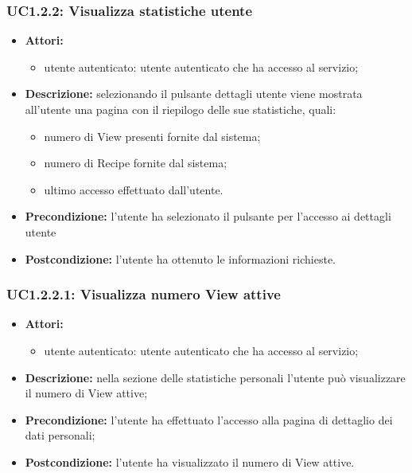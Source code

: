 \subsubsection{UC1.2.2: Visualizza statistiche utente}

\begin{itemize}
	\item \textbf{Attori:}
	\begin{itemize}
		\item utente autenticato: utente autenticato che ha accesso al servizio;
	\end{itemize}
	\item \textbf{Descrizione:} selezionando il pulsante dettagli utente viene mostrata all'utente una pagina con il riepilogo delle sue statistiche, quali:
	\begin{itemize}
		\item numero di View presenti fornite dal sistema;
		\item numero di Recipe fornite dal sistema;
		\item ultimo accesso effettuato dall'utente.
	\end{itemize}
  \item \textbf{Precondizione:} l'utente ha selezionato il pulsante per l'accesso ai dettagli utente
	\item \textbf{Postcondizione:} l'utente ha ottenuto le informazioni richieste.
\end{itemize}

\subsubsection{UC1.2.2.1: Visualizza numero View attive}

\begin{itemize}
	\item \textbf{Attori:}
	\begin{itemize}
		\item utente autenticato: utente autenticato che ha accesso al servizio;
	\end{itemize}
	\item \textbf{Descrizione:} nella sezione delle statistiche personali l'utente può visualizzare il numero di View attive;
	\item \textbf{Precondizione:} l'utente ha effettuato l'accesso alla pagina di dettaglio dei dati personali;
	\item \textbf{Postcondizione:} l'utente ha visualizzato il numero di View attive.
\end{itemize}

